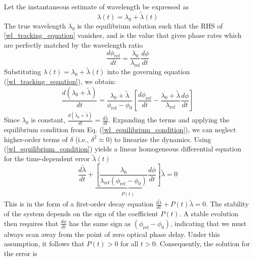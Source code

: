 \documentclass[8pt,a4paper]{report}
\begin{document}
	Let the instantaneous estimate of wavelength be expressed as
	\begin{equation}
		\lambda(t) = \lambda_0 + \tilde{\lambda}(t)
	\end{equation}
	The true wavelength $\lambda_0$ is the equilibrium solution such that the RHS of \ref{wl_tracking_equation} vanishes, and is the value that gives phase rates which are perfectly matched by the wavelength ratio
	\begin{equation} \label{wl_equilibrium_condition}
		\frac{d\phi_\mathrm{ref}}{dt} = \frac{\lambda_0}{\lambda_\mathrm{ref}}\frac{d\phi}{dt}
	\end{equation}
	Substituting $\lambda(t) = \lambda_0 +  \tilde{\lambda}(t)$ into the governing equation (\ref{wl_tracking_equation}), we obtain:
	\begin{equation}
		\frac{d(\lambda_0 + \tilde{\lambda})}{dt} = \frac{\lambda_0 + \tilde{\lambda}}{\phi_\mathrm{ref} - \phi_0} \left[ \frac{d\phi_\mathrm{ref}}{dt} - \frac{\lambda_0 + \tilde{\lambda}}{\lambda_\mathrm{ref}}\frac{d\phi}{dt} \right]
	\end{equation}
	Since $\lambda_0$ is constant, $\frac{d(\lambda_0 + \tilde{\lambda})}{dt} = \frac{d\tilde{\lambda}}{dt}$. Expanding the terms and applying the equilibrium condition from Eq. (\ref{wl_equilibrium_condition}), we can neglect higher-order terms of $\delta$ (i.e., $\delta^2 \approx 0$) to linearize the dynamics.
	Using (\ref{wl_equilibrium_condition}) yields a linear homogeneous differential equation for the time-dependent error $ \tilde{\lambda}(t)$
	\begin{equation}
		\frac{d\tilde{\lambda}}{dt} + \underbrace{\left[ \frac{\lambda_0}{\lambda_\mathrm{ref}(\phi_\mathrm{ref} - \phi_0)} \frac{d\phi}{dt} \right]}_{\begin{matrix}P(t)\end{matrix}} \tilde{\lambda} = 0
	\end{equation}
	This is in the form of a first-order decay equation $\frac{d\tilde{\lambda}}{dt} + P(t)\tilde{\lambda} = 0$. The stability of the system depends on the sign of the coefficient $P(t)$. A stable evolution then requires that $\frac{d\phi}{dt}$ has the same sign as $(\phi_\mathrm{ref} - \phi_0)$, indicating that we must always scan away from the point of zero optical phase delay. Under this assumption, it follows that $P(t) > 0$ for all $t > 0$. Consequently, the solution for the error is
\end{document}
